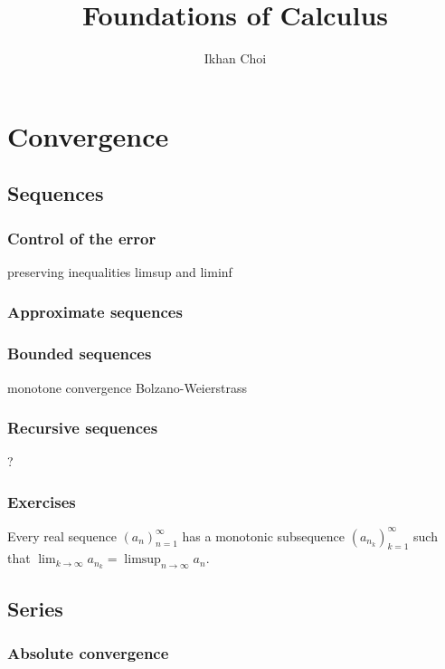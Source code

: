 \documentclass{../note}
\begin{document}
\title{Foundations of Calculus}
\author{Ikhan Choi}
\maketitle
\tableofcontents

\part{Convergence}
\chapter{Sequences}

\section{Control of the error}
preserving inequalities
limsup and liminf
\section{Approximate sequences}
\section{Bounded sequences}
monotone convergence
Bolzano-Weierstrass
\section{Recursive sequences}
?
\section*{Exercises}
\begin{prb}
Every real sequence $(a_n)_{n=1}^\infty$ has a monotonic subsequence $(a_{n_k})_{k=1}^\infty$ such that $\lim_{k\to\infty}a_{n_k}=\limsup_{n\to\infty}a_n$.
\end{prb}



\chapter{Series}

\section{Absolute convergence}
\begin{prb}
\end{prb}
\end{document}
